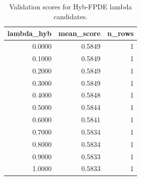 \begin{table}[t]
\caption{Validation scores for Hyb-FPDE lambda candidates.}
\label{tab:lambda_distribution_computed}
\centering
\begin{tabular}{rrr}
\toprule
lambda\_hyb & mean\_score & n\_rows \\
\midrule
0.0000 & 0.5849 & 1 \\
0.1000 & 0.5849 & 1 \\
0.2000 & 0.5849 & 1 \\
0.3000 & 0.5849 & 1 \\
0.4000 & 0.5848 & 1 \\
0.5000 & 0.5844 & 1 \\
0.6000 & 0.5841 & 1 \\
0.7000 & 0.5834 & 1 \\
0.8000 & 0.5834 & 1 \\
0.9000 & 0.5833 & 1 \\
1.0000 & 0.5833 & 1 \\
\bottomrule
\end{tabular}

\end{table}
